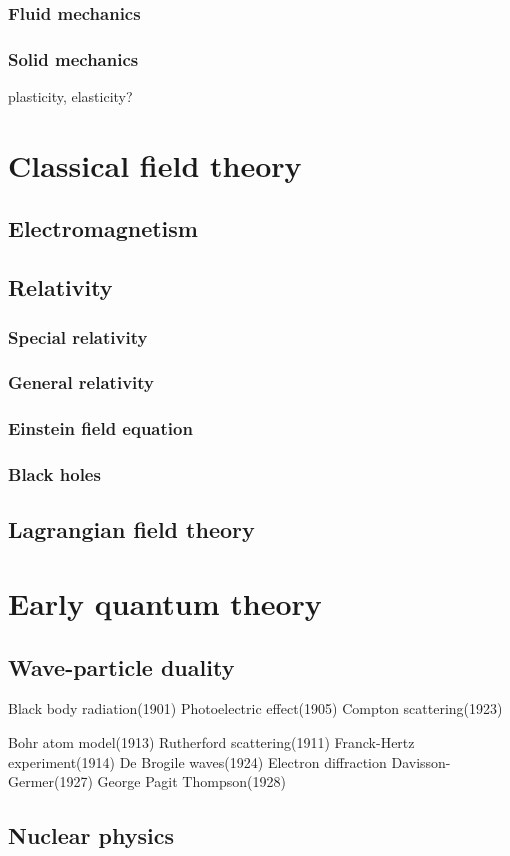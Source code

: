 \documentclass{../note}
\begin{document}
\section{Fluid mechanics}
\section{Solid mechanics}
plasticity, elasticity?







\part{Classical field theory}
\chapter{Electromagnetism}

\chapter{Relativity}
\section{Special relativity}
\section{General relativity}
\section{Einstein field equation}
\section{Black holes}

\chapter{Lagrangian field theory}







\part{Early quantum theory}
\chapter{Wave-particle duality}
Black body radiation(1901)
Photoelectric effect(1905)
Compton scattering(1923)

Bohr atom model(1913)
	Rutherford scattering(1911)
	Franck-Hertz experiment(1914)
De Brogile waves(1924)
Electron diffraction
	Davisson-Germer(1927)
	George Pagit Thompson(1928)
\chapter{Nuclear physics}
\chapter{}
\end{document}
